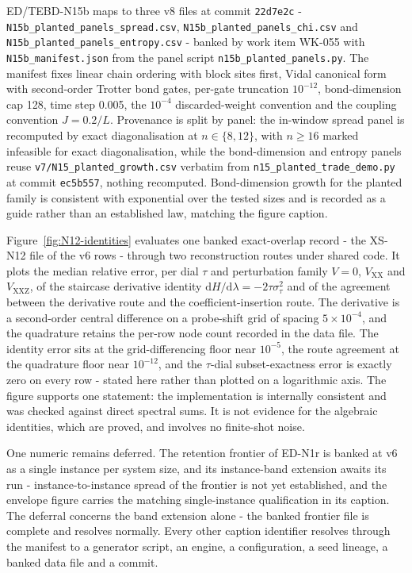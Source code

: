 ED/TEBD-N15b maps to three v8 files at commit \texttt{22d7e2c} - \texttt{N15b\_planted\_panels\_spread.csv}, \texttt{N15b\_planted\_panels\_chi.csv} and \texttt{N15b\_planted\_panels\_entropy.csv} - banked by work item WK-055 with \texttt{N15b\_manifest.json} from the panel script \texttt{n15b\_planted\_panels.py}. The manifest fixes linear chain ordering with block sites first, Vidal canonical form with second-order Trotter bond gates, per-gate truncation $10^{-12}$, bond-dimension cap 128, time step 0.005, the $10^{-4}$ discarded-weight convention and the coupling convention $J = 0.2/L$. Provenance is split by panel: the in-window spread panel is recomputed by exact diagonalisation at $n \in \{8, 12\}$, with $n \ge 16$ marked infeasible for exact diagonalisation, while the bond-dimension and entropy panels reuse \texttt{v7/N15\_planted\_growth.csv} verbatim from \texttt{n15\_planted\_trade\_demo.py} at commit \texttt{ec5b557}, nothing recomputed. Bond-dimension growth for the planted family is consistent with exponential over the tested sizes \cite{eisert2010area} and is recorded as a guide rather than an established law, matching the figure caption.

Figure~\ref{fig:N12-identities} evaluates one banked exact-overlap record - the XS-N12 file of the v6 rows - through two reconstruction routes under shared code. It plots the median relative error, per dial $\tau$ and perturbation family $V = 0$, $V_{\mathrm{XX}}$ and $V_{\mathrm{XXZ}}$, of the staircase derivative identity $\mathrm{d}H/\mathrm{d}\lambda = -2\tau\sigma_{\tau}^{2}$ and of the agreement between the derivative route and the coefficient-insertion route. The derivative is a second-order central difference on a probe-shift grid of spacing $5 \times 10^{-4}$, and the quadrature retains the per-row node count recorded in the data file. The identity error sits at the grid-differencing floor near $10^{-5}$, the route agreement at the quadrature floor near $10^{-12}$, and the $\tau$-dial subset-exactness error is exactly zero on every row - stated here rather than plotted on a logarithmic axis. The figure supports one statement: the implementation is internally consistent and was checked against direct spectral sums. It is not evidence for the algebraic identities, which are proved, and involves no finite-shot noise.

One numeric remains deferred. The retention frontier of ED-N1r is banked at v6 as a single instance per system size, and its instance-band extension awaits its run - instance-to-instance spread of the frontier is not yet established, and the envelope figure carries the matching single-instance qualification in its caption. The deferral concerns the band extension alone - the banked frontier file is complete and resolves normally. Every other caption identifier resolves through the manifest to a generator script, an engine, a configuration, a seed lineage, a banked data file and a commit.
